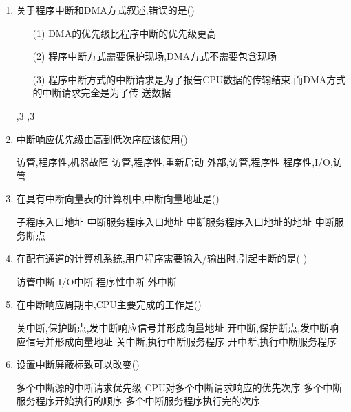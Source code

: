 \documentclass[12pt, a4paper, oneside, UTF8]{ctexbook}
\begin{document}
\begin{enumerate}
    \item  关于程序中断和DMA方式叙述,错误的是() 
    \begin{enumerate}
        \item [(1)] DMA的优先级比程序中断的优先级更高
        \item [(2)] 程序中断方式需要保护现场,DMA方式不需要包含现场
        \item [(3)] 程序中断方式的中断请求是为了报告CPU数据的传输结束,而DMA方式的中断请求完全是为了传
        送数据 
    \end{enumerate}
    \begin{choices}
         ,3  ,3
    \end{choices}

    \item 中断响应优先级由高到低次序应该使用() 
    \begin{choices}[2]
        \task 访管,程序性,机器故障 
        \task 访管,程序性,重新启动 
        \task 外部,访管,程序性 
        \task 程序性,I/O,访管 
    \end{choices}

    \item 在具有中断向量表的计算机中,中断向量地址是() 
    \begin{choices}[2]
        \task 子程序入口地址 
        \task 中断服务程序入口地址 
        \task 中断服务程序入口地址的地址 
        \task 中断服务断点 
    \end{choices}

    \item 在配有通道的计算机系统,用户程序需要输入/输出时,引起中断的是(   ) 
    \begin{choices}
        \task 访管中断 \task I/O中断 \task 程序性中断 \task 外中断 
    \end{choices}

    \item 在中断响应周期中,CPU主要完成的工作是() 
    \begin{choices}[1]
        \task 关中断,保护断点,发中断响应信号并形成向量地址 
        \task 开中断,保护断点,发中断响应信号并形成向量地址 
        \task 关中断,执行中断服务程序 
        \task 开中断,执行中断服务程序  
    \end{choices}

    \item 设置中断屏蔽标致可以改变() 
    \begin{choices}[2]
        \task 多个中断源的中断请求优先级 
        \task CPU对多个中断请求响应的优先次序
        \task 多个中断服务程序开始执行的顺序 
        \task 多个中断服务程序执行完的次序 
    \end{choices}


\end{enumerate}
\end{document}
